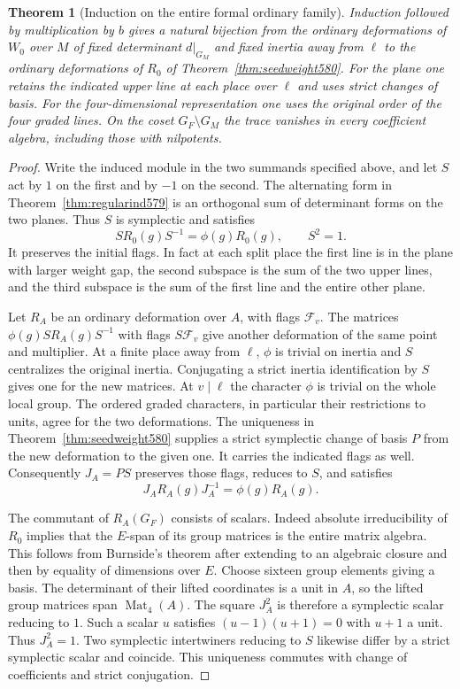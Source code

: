 \documentclass[a4paper,11pt]{article}
\newtheorem{theorem}[proposition]{Theorem}
\theoremstyle{definition}
\theoremstyle{remark}
\numberwithin{equation}{section}
\begin{document}
\begin{theorem}[Induction on the entire formal ordinary family]
\leavevmode\label{thm:quadraticfamily583}
Induction followed by multiplication by \(b\) gives a natural
bijection from the ordinary deformations of \(W_0\) over \(M\)
of fixed determinant \(d|_{G_M}\) and fixed inertia away from
\(\ell\) to the ordinary deformations of \(R_0\) of
Theorem~\ref{thm:seedweight580}. For the plane one retains
the indicated upper line at each place over \(\ell\) and uses
strict changes of basis. For the four-dimensional representation
one uses the original order of the four graded lines. On the
coset \(G_F\setminus G_M\) the trace vanishes in every coefficient
algebra, including those with nilpotents.
\end{theorem}
\begin{proof}
Write the induced module in the two summands specified above,
and let \(S\) act by \(1\) on the first and by \(-1\) on the
second. The alternating form in Theorem~\ref{thm:regularind579}
is an orthogonal sum of determinant forms on the two planes.
Thus \(S\) is symplectic and satisfies
\[
       S R_0(g)S^{-1}=\phi(g)R_0(g),\qquad S^2=1.
\]
It preserves the initial flags. In fact at each split place
the first line is in the plane with larger weight gap, the
second subspace is the sum of the two upper lines, and the
third subspace is the sum of the first line and the entire
other plane.

Let \(R_A\) be an ordinary deformation over \(A\), with flags
\(\mathcal F_v\). The matrices \(\phi(g)S R_A(g)S^{-1}\)
with flags \(S\mathcal F_v\) give another deformation of
the same point and multiplier. At a finite place away from
\(\ell\), \(\phi\) is trivial on inertia and \(S\) centralizes
the original inertia. Conjugating a strict inertia identification
by \(S\) gives one for the new matrices. At \(v\mid\ell\)
the character \(\phi\) is trivial on the whole local group.
The ordered graded characters, in particular their restrictions
to units, agree for the two deformations. The uniqueness in
Theorem~\ref{thm:seedweight580} supplies a strict symplectic
change of basis \(P\) from the new deformation to the given one.
It carries the indicated flags as well. Consequently \(J_A=PS\)
preserves those flags, reduces to \(S\), and satisfies
\[
        J_A R_A(g)J_A^{-1}=\phi(g)R_A(g).
\]

The commutant of \(R_A(G_F)\) consists of scalars. Indeed
absolute irreducibility of \(R_0\) implies that the \(E\)-span
of its group matrices is the entire matrix algebra. This follows
from Burnside's theorem after extending to an algebraic closure
and then by equality of dimensions over \(E\). Choose sixteen
group elements giving a basis. The determinant of their lifted
coordinates is a unit in \(A\), so the lifted group matrices span
\(\operatorname{Mat}_4(A)\). The square \(J_A^2\) is therefore a
symplectic scalar reducing to \(1\). Such a scalar \(u\) satisfies
\((u-1)(u+1)=0\) with \(u+1\) a unit. Thus \(J_A^2=1\).
Two symplectic intertwiners reducing to \(S\) likewise differ
by a strict symplectic scalar and coincide. This uniqueness
commutes with change of coefficients and strict conjugation.


\end{proof}
\end{document}
